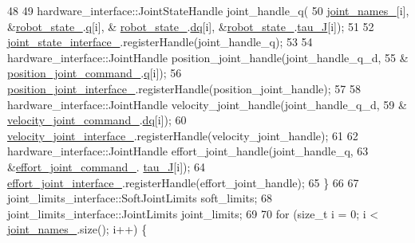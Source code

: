 \begin{DoxyCode}
48 
49     hardware\_interface::JointStateHandle joint\_handle\_q(
50         \hyperlink{classfranka__hw_1_1FrankaHW_a209e8f3424efe0fd05725be609d7205a}{joint\_names\_}[i], &\hyperlink{classfranka__hw_1_1FrankaHW_a1b9c3149cda8b7d78d52ecea65a8ebab}{robot\_state\_}.\hyperlink{structfranka_1_1RobotState_ade3335d1ac2f6c44741a916d565f7091}{q}[i], &
      \hyperlink{classfranka__hw_1_1FrankaHW_a1b9c3149cda8b7d78d52ecea65a8ebab}{robot\_state\_}.\hyperlink{structfranka_1_1RobotState_af372a0081d72bc7b4fe873f99c7b2d8c}{dq}[i], &\hyperlink{classfranka__hw_1_1FrankaHW_a1b9c3149cda8b7d78d52ecea65a8ebab}{robot\_state\_}.\hyperlink{structfranka_1_1RobotState_ad90e2518d661da0d8fa4c864bae210e5}{tau\_J}[i]);
51 
52     \hyperlink{classfranka__hw_1_1FrankaHW_a71a3f8c221792e3d833ac3d50e61a8fc}{joint\_state\_interface\_}.registerHandle(joint\_handle\_q);
53 
54     hardware\_interface::JointHandle position\_joint\_handle(joint\_handle\_q\_d,
55                                                           &
      \hyperlink{classfranka__hw_1_1FrankaHW_a21bc8c749210aa50ac5a847065d01042}{position\_joint\_command\_}.\hyperlink{classfranka_1_1JointPositions_a40e9098abe1c51cd48e17e41fbf78337}{q}[i]);
56     \hyperlink{classfranka__hw_1_1FrankaHW_aed81f869c0785e8257c9b21ce3a54f48}{position\_joint\_interface\_}.registerHandle(position\_joint\_handle);
57 
58     hardware\_interface::JointHandle velocity\_joint\_handle(joint\_handle\_q\_d,
59                                                           &
      \hyperlink{classfranka__hw_1_1FrankaHW_ae25ff898759d1f0c9a34c873cadd8e01}{velocity\_joint\_command\_}.\hyperlink{classfranka_1_1JointVelocities_a14fddb6fe7a7c4034dc82c283de8c2d3}{dq}[i]);
60     \hyperlink{classfranka__hw_1_1FrankaHW_aae00e8f592019644703aaebcc8b6d8db}{velocity\_joint\_interface\_}.registerHandle(velocity\_joint\_handle);
61 
62     hardware\_interface::JointHandle effort\_joint\_handle(joint\_handle\_q,
63                                                         &\hyperlink{classfranka__hw_1_1FrankaHW_a718469d0646cacde1bd8ad1b798a528c}{effort\_joint\_command\_}.
      \hyperlink{classfranka_1_1Torques_ac2a266cc2d3b7e0fb4f8eff045dbaed8}{tau\_J}[i]);
64     \hyperlink{classfranka__hw_1_1FrankaHW_a5f695d0eb767c02397372cb5536db00c}{effort\_joint\_interface\_}.registerHandle(effort\_joint\_handle);
65   \}
66 
67   joint\_limits\_interface::SoftJointLimits soft\_limits;
68   joint\_limits\_interface::JointLimits joint\_limits;
69 
70   \textcolor{keywordflow}{for} (\textcolor{keywordtype}{size\_t} i = 0; i < \hyperlink{classfranka__hw_1_1FrankaHW_a209e8f3424efe0fd05725be609d7205a}{joint\_names\_}.size(); i++) \{

\end{DoxyCode}
